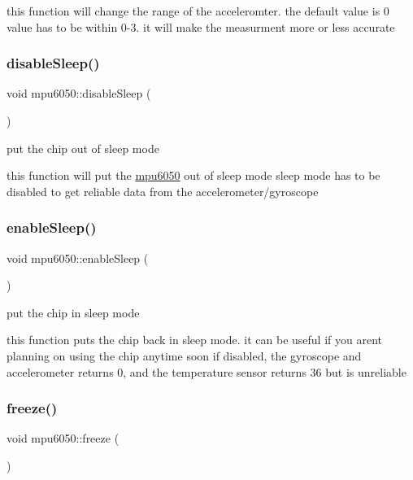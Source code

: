 this function will change the range of the acceleromter. the default value is 0 value has to be within 0-\/3. it will make the measurment more or less accurate \mbox{\label{classmpu6050_af945ffe99c421c67cd4e4134a37f99d2}} 
\subsubsection{\texorpdfstring{disable\+Sleep()}{disableSleep()}}
{\footnotesize\ttfamily void mpu6050\+::disable\+Sleep (\begin{DoxyParamCaption}{ }\end{DoxyParamCaption})}



put the chip out of sleep mode 

this function will put the \hyperlink{classmpu6050}{mpu6050} out of sleep mode sleep mode has to be disabled to get reliable data from the accelerometer/gyroscope \mbox{\label{classmpu6050_a766d1a6a4d9af1dc47a21ae91b1ee289}} 
\subsubsection{\texorpdfstring{enable\+Sleep()}{enableSleep()}}
{\footnotesize\ttfamily void mpu6050\+::enable\+Sleep (\begin{DoxyParamCaption}{ }\end{DoxyParamCaption})}



put the chip in sleep mode 

this function puts the chip back in sleep mode. it can be useful if you aren\textquotesingle{}t planning on using the chip anytime soon if disabled, the gyroscope and accelerometer returns 0, and the temperature sensor returns 36 but is unreliable \mbox{\label{classmpu6050_ad4a85ae4b16557eed6d4d690840f8358}} 
\subsubsection{\texorpdfstring{freeze()}{freeze()}}
{\footnotesize\ttfamily void mpu6050\+::freeze (\begin{DoxyParamCaption}{ }\end{DoxyParamCaption})}



